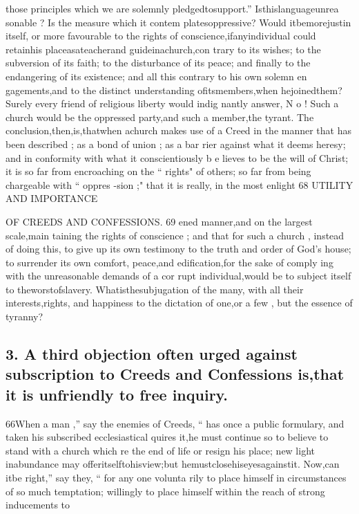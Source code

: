\documentclass[
]{book}
\begin{document}
those principles which we are solemnly pledgedtosupport.'' Isthislanguageunrea sonable ? Is the measure which it contem
platesoppressive? Would itbemorejustin itself, or more favourable to the rights of conscience,ifanyindividual could retainhis
placeasateacherand guideinachurch,con trary to its wishes; to the subversion of its
faith; to the disturbance of its peace; and finally to the endangering of its existence; and all this contrary to his own solemn en gagements,and to the distinct understanding
ofitsmembers,when hejoinedthem?Surely every friend of religious liberty would indig nantly answer, N o ! Such a church would be
the oppressed party,and such a member,the tyrant.
The conclusion,then,is,thatwhen achurch makes use of a Creed in the manner that has
been described ; as a bond of union ; as a bar rier against what it deems heresy; and in conformity with what it conscientiously b e lieves to be the will of Christ; it is so far from encroaching on the `` rights" of others; so far from being chargeable with `` oppres
-sion ;" that it is really, in the most enlight
68 UTILITY AND IMPORTANCE

OF CREEDS AND CONFESSIONS. 69
ened manner,and on the largest scale,main taining the rights of conscience ; and that for
such a church , instead of doing this, to give up its own testimony to the truth and order of
God's house; to surrender its own comfort, peace,and edification,for the sake of comply
ing with the unreasonable demands of a cor rupt individual,would be to subject itself to
theworstofslavery. Whatisthesubjugation
of the many, with all their interests,rights,
and happiness to the dictation of one,or a few , but the essence of tyranny?

\hypertarget{a-third-objection-often-urged-against-subscription-to-creeds-and-confessions-isthat-it-is-unfriendly-to-free-inquiry.}{%
\subsection{3. A third objection often urged against subscription to Creeds and Confessions is,that it is unfriendly to free inquiry.}\label{a-third-objection-often-urged-against-subscription-to-creeds-and-confessions-isthat-it-is-unfriendly-to-free-inquiry.}}

66When a man ,'' say the enemies of Creeds, `` has once
a public formulary, and taken his
subscribed
ecclesiastical
quires it,he must continue so to believe to
stand with a church which re
the end of life or resign his place; new light inabundance may offeritselftohisview;but hemustclosehiseyesagainstit. Now,can
itbe right,'' say they, `` for any one volunta
rily to place himself in circumstances
of so
much temptation; willingly to place himself within the reach of strong inducements to
\end{document}

